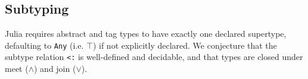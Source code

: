 \documentclass[10pt, preprint]{sigplanconf}
\begin{document}







\subsection{Subtyping}
\label{sec:subtyping}

Julia requires abstract and tag types to have exactly one
declared supertype, defaulting to \verb|Any| (i.e. $\top$) if not explicitly declared.
We conjecture that the subtype relation \verb|<:| is well-defined and
decidable, and that types are closed under meet ($\wedge$) and
join ($\vee$).

\end{document}

